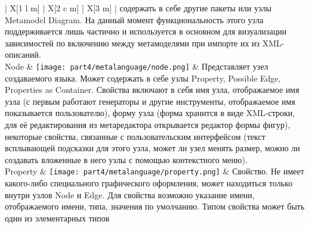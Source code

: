 \begin{center}
\begin{longtabu} {| X[1 l m] | X[2 c m] | X[3 m] |}
		                                                                                                                содержать в себе другие пакеты или узлы Metamodel Diagram. На данный момент  
		                                                                                                                функциональность этого узла поддерживается лишь частично и используется в основном для 
		                                                                                                                визуализации зависимостей по включению между метамоделями при импорте их из XML-описаний. \\
		Node                        & \texttt{[image: part4/metalanguage/node.png]}                        & Представляет узел создаваемого языка. Может содержать в себе узлы Property, Possible Edge, 
		                                                                                                                Properties as Container. Свойства включают в себя имя узла, отображаемое имя узла (с 
		                                                                                                                первым работают генераторы и другие инструменты, отображаемое имя показывается 
		                                                                                                                пользователю), форму узла (форма хранится в виде XML-строки, для её редактирования из 
		                                                                                                                метаредактора открывается редактор формы фигур), некоторые свойства, связанные с 
		                                                                                                                пользовательским интерфейсом (текст всплывающей подсказки для этого узла, может 
		                                                                                                                ли узел менять размер, можно ли создавать вложенные в него узлы с помощью контекстного меню). \\
		Property                    & \texttt{[image: part4/metalanguage/property.png]}                    & Свойство. Не имеет какого-либо специального графического оформления, может находиться 
		                                                                                                                только внутри узлов Node и Edge. Для свойства возможно указание имени, отображаемого имени, 
		                                                                                                                типа, значения по умолчанию. Типом свойства может быть один из элементарных типов 

\end{longtabu}
\end{center}

